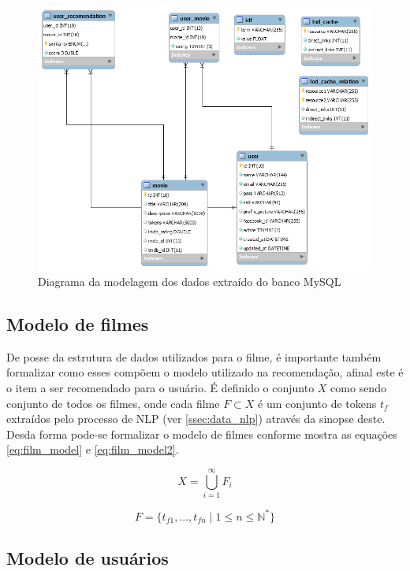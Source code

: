 \begin{figure}
	\centering
	\includegraphics[scale=0.5]{imagens/user_model.png}
	\caption{Diagrama da modelagem dos dados extraído do banco MySQL}
	\label{fig:user_model}
\end{figure}

\subsection{Modelo de filmes}

De posse da estrutura de dados utilizados para o filme, é importante também formalizar como esses compõem o modelo utilizado na recomendação, afinal este é o item a ser recomendado para o usuário. É definido o conjunto $X$ como sendo conjunto de todos os filmes, onde cada filme $F \subset X$ é um conjunto de tokens $t_f$ extraídos pelo processo de \ac{NLP} (ver \ref{ssec:data_nlp}) através da sinopse deste. Desda forma pode-se formalizar o modelo de filmes conforme mostra as equações \ref{eq:film_model} e \ref{eq:film_model2}.

\begin{equation}
	X = \bigcup\limits_{i=1}^{\infty} F_{i}
\label{eq:film_model}
\end{equation}

\begin{equation}
	F = \{t_{f1}, ..., t_{fn} \; | \; 1 \leq n \leq \mathbb{N}^*\}
\label{eq:film_model2}
\end{equation}

\subsection{Modelo de usuários}

